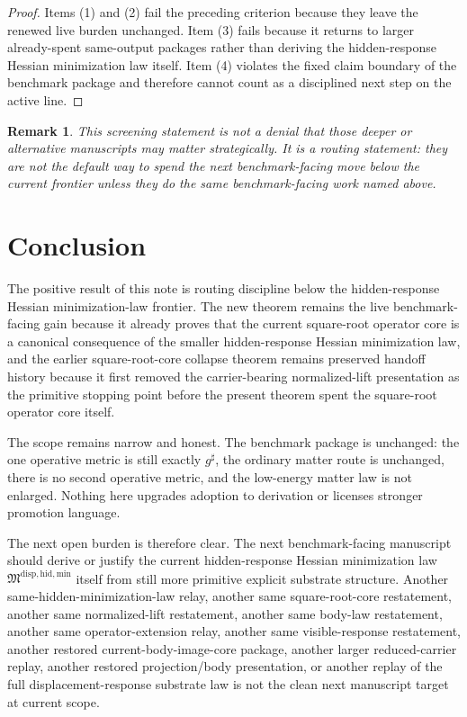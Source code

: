 \documentclass[11pt]{article}
\newcommand{\CompletedMetric}{g^{\sharp}}
\newcommand{\HiddenMinimizationPackage}{\mathfrak M^{\mathrm{disp,hid,min}}}
\newtheorem{remark}{Remark}
\begin{document}
\begin{proof}
Items (1) and (2) fail the preceding criterion because they leave the renewed live burden unchanged. Item (3) fails because it returns to larger already-spent same-output packages rather than deriving the hidden-response Hessian minimization law itself. Item (4) violates the fixed claim boundary of the benchmark package and therefore cannot count as a disciplined next step on the active line.
\end{proof}

\begin{remark}
This screening statement is not a denial that those deeper or alternative manuscripts may matter strategically. It is a routing statement: they are not the default way to spend the next benchmark-facing move below the current frontier unless they do the same benchmark-facing work named above.
\end{remark}

\section{Conclusion}

The positive result of this note is routing discipline below the hidden-response Hessian minimization-law frontier. The new theorem remains the live benchmark-facing gain because it already proves that the current square-root operator core is a canonical consequence of the smaller hidden-response Hessian minimization law, and the earlier square-root-core collapse theorem remains preserved handoff history because it first removed the carrier-bearing normalized-lift presentation as the primitive stopping point before the present theorem spent the square-root operator core itself.

The scope remains narrow and honest. The benchmark package is unchanged: the one operative metric is still exactly \(\CompletedMetric\), the ordinary matter route is unchanged, there is no second operative metric, and the low-energy matter law is not enlarged. Nothing here upgrades adoption to derivation or licenses stronger promotion language.

The next open burden is therefore clear. The next benchmark-facing manuscript should derive or justify the current hidden-response Hessian minimization law \(\HiddenMinimizationPackage\) itself from still more primitive explicit substrate structure. Another same-hidden-minimization-law relay, another same square-root-core restatement, another same normalized-lift restatement, another same body-law restatement, another same operator-extension relay, another same visible-response restatement, another restored current-body-image-core package, another larger reduced-carrier replay, another restored projection/body presentation, or another replay of the full displacement-response substrate law is not the clean next manuscript target at current scope.
\end{document}
